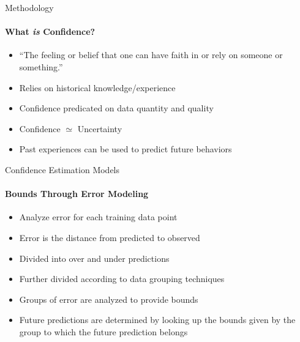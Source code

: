 \documentclass{beamer}
\begin{document}
\begin{frame}[t]{Methodology}
  \framesubtitle{What \emph{is} Confidence?}

  \begin{itemize}
    \setlength\itemsep{0.75em}
    \item “The feeling or belief that one can have faith in or rely on someone or something.” \cite{Confidence2019}
    \item Relies on historical knowledge/experience
    \item Confidence predicated on data quantity and quality
    \item Confidence $\simeq$ Uncertainty \cite{Geifman2018}
    \item Past experiences can be used to predict future behaviors

    \end{itemize}

\end{frame}



\begin{frame}[t]{Confidence Estimation Models}
  \framesubtitle{Bounds Through Error Modeling }
  \begin{itemize}

      \setlength\itemsep{1em}
      \item Analyze error for each training data point
      \item Error is the distance from predicted to observed
      \item Divided into over and under predictions
      \item Further divided according to data grouping techniques
      \item Groups of error are analyzed to provide bounds
      \item Future predictions are determined by looking up the bounds given
            by the group to which the future prediction belongs

  \end{itemize}
\end{frame}
\end{document}
